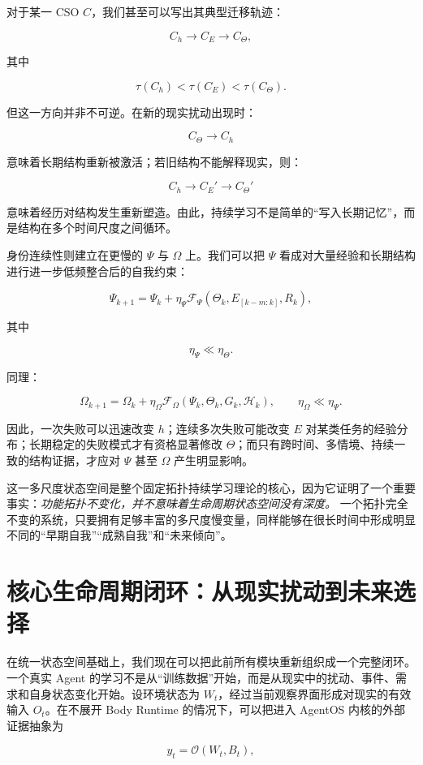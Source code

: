 对于某一 CSO $C$，我们甚至可以写出其典型迁移轨迹：

\[
C_h
\rightarrow
C_E
\rightarrow
C_\Theta,
\]

其中

\[
\tau(C_h)
<
\tau(C_E)
<
\tau(C_\Theta).
\]

但这一方向并非不可逆。在新的现实扰动出现时：

\[
C_\Theta
\rightarrow
C_h
\]

意味着长期结构重新被激活；若旧结构不能解释现实，则：

\[
C_h
\rightarrow
C_E'
\rightarrow
C_\Theta'
\]

意味着经历对结构发生重新塑造。由此，持续学习不是简单的“写入长期记忆”，而是结构在多个时间尺度之间循环。

身份连续性则建立在更慢的 $\Psi$ 与 $\Omega$ 上。我们可以把 $\Psi$ 看成对大量经验和长期结构进行进一步低频整合后的自我约束：

\[
\Psi_{k+1}
=
\Psi_k
+
\eta_\Psi
\mathcal{F}_\Psi
(
\Theta_k,
E_{[k-m:k]},
R_k
),
\]

其中

\[
\eta_\Psi
\ll
\eta_\Theta.
\]

同理：

\[
\Omega_{k+1}
=
\Omega_k
+
\eta_\Omega
\mathcal{F}_\Omega
(
\Psi_k,
\Theta_k,
G_k,
\mathcal{H}_k
),
\qquad
\eta_\Omega
\ll
\eta_\Psi.
\]

因此，一次失败可以迅速改变 $h$；连续多次失败可能改变 $E$ 对某类任务的经验分布；长期稳定的失败模式才有资格显著修改 $\Theta$；而只有跨时间、多情境、持续一致的结构证据，才应对 $\Psi$ 甚至 $\Omega$ 产生明显影响。

这一多尺度状态空间是整个固定拓扑持续学习理论的核心，因为它证明了一个重要事实：\emph{功能拓扑不变化，并不意味着生命周期状态空间没有深度。} 一个拓扑完全不变的系统，只要拥有足够丰富的多尺度慢变量，同样能够在很长时间中形成明显不同的“早期自我”“成熟自我”和“未来倾向”。

\section{核心生命周期闭环：从现实扰动到未来选择}

在统一状态空间基础上，我们现在可以把此前所有模块重新组织成一个完整闭环。一个真实 Agent 的学习不是从“训练数据”开始，而是从现实中的扰动、事件、需求和自身状态变化开始。设环境状态为 $W_t$，经过当前观察界面形成对现实的有效输入 $O_t$。在不展开 Body Runtime 的情况下，可以把进入 AgentOS 内核的外部证据抽象为

\[
y_t
=
\mathcal{O}(W_t,B_t),
\]

